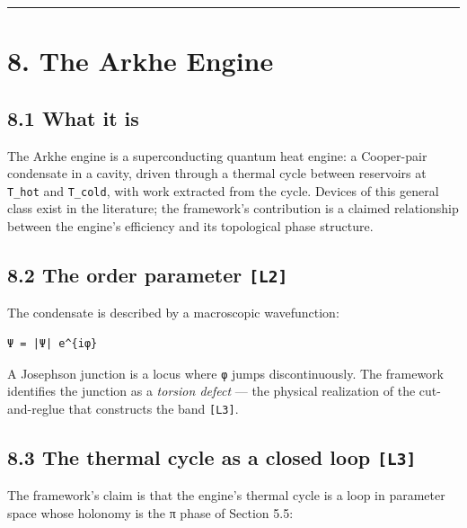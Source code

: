 \documentclass[
  11pt]{report}
\begin{document}
\begin{center}\rule{0.5\linewidth}{0.5pt}\end{center}

\hypertarget{the-arkhe-engine}{%
\chapter{8. The Arkhe Engine}\label{the-arkhe-engine}}

\hypertarget{what-it-is}{%
\section{8.1 What it is}\label{what-it-is}}

The Arkhe engine is a superconducting quantum heat engine: a Cooper-pair
condensate in a cavity, driven through a thermal cycle between
reservoirs at \texttt{T\_hot} and \texttt{T\_cold}, with work extracted
from the cycle. Devices of this general class exist in the literature;
the framework's contribution is a claimed relationship between the
engine's efficiency and its topological phase structure.

\hypertarget{the-order-parameter-l2}{%
\section{\texorpdfstring{8.2 The order parameter
\texttt{{[}L2{]}}}{8.2 The order parameter {[}L2{]}}}\label{the-order-parameter-l2}}

The condensate is described by a macroscopic wavefunction:

\begin{verbatim}
Ψ = |Ψ| e^{iφ}
\end{verbatim}

A Josephson junction is a locus where \texttt{φ} jumps discontinuously.
The framework identifies the junction as a \emph{torsion defect} --- the
physical realization of the cut-and-reglue that constructs the band
\texttt{{[}L3{]}}.

\hypertarget{the-thermal-cycle-as-a-closed-loop-l3}{%
\section{\texorpdfstring{8.3 The thermal cycle as a closed loop
\texttt{{[}L3{]}}}{8.3 The thermal cycle as a closed loop {[}L3{]}}}\label{the-thermal-cycle-as-a-closed-loop-l3}}

The framework's claim is that the engine's thermal cycle is a loop in
parameter space whose holonomy is the π phase of Section 5.5:
\end{document}
